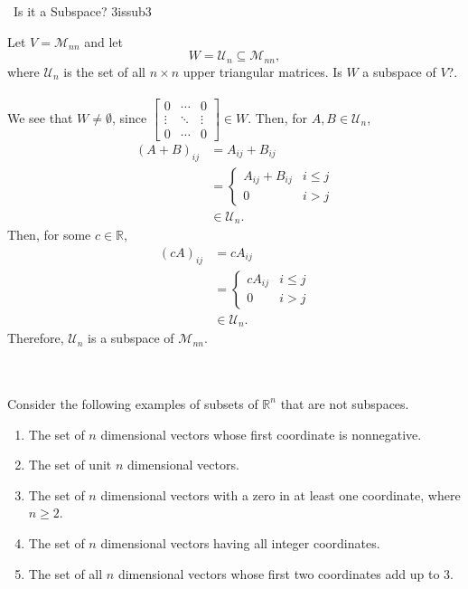         \begin{example}{\Difficulty\,\Difficulty\,\,Is it a Subspace? 3}{issub3}

            Let \(V=\mathcal{M}_{nn}\) and let
            \begin{equation*}
                W=\mathcal{U}_n\subseteq\mathcal{M}_{nn},
            \end{equation*}
            where \(\mathcal{U}_n\) is the set of all \(n\times n\) upper triangular matrices. Is \(W\) a subspace of \(V\)?.
            \\
            \\
            We see that \(W\neq\emptyset\), since \(\begin{bmatrix} 0 & \cdots & 0 \\ \vdots & \ddots & \vdots \\ 0 & \cdots & 0 \end{bmatrix}\in W\). Then,
            for \(A,B\in\mathcal{U}_n\), 
            \begin{align*}
                (A+B)_{ij}&=A_{ij}+B_{ij} \\
                &=\begin{cases}
                    A_{ij}+B_{ij} & i\leq j \\
                    0 & i > j
                \end{cases} \\
                &\in\mathcal{U}_n.
            \end{align*}
            Then, for some \(c\in\mathbb{R}\),
            \begin{align*}
                (cA)_{ij}&=cA_{ij} \\
                &=\begin{cases}
                    cA_{ij} & i\leq j \\
                    0 & i > j
                \end{cases} \\
                &\in\mathcal{U}_n.
            \end{align*}
            Therefore, \(\mathcal{U}_n\) is a subspace of \(\mathcal{M}_{nn}\).
        \end{example}
        \vphantom
        \\
        \\
        Consider the following examples of subsets of \(\mathbb{R}^n\) that are not subspaces.
        \begin{enumerate}
            \item The set of \(n\) dimensional vectors whose first coordinate is nonnegative.
            \item The set of unit \(n\) dimensional vectors.
            \item The set of \(n\) dimensional vectors with a zero in at least one coordinate, where \(n\geq 2\).
            \item The set of \(n\) dimensional vectors having all integer coordinates.
            \item The set of all \(n\) dimensional vectors whose first two coordinates add up to \(3\).
        \end{enumerate}
